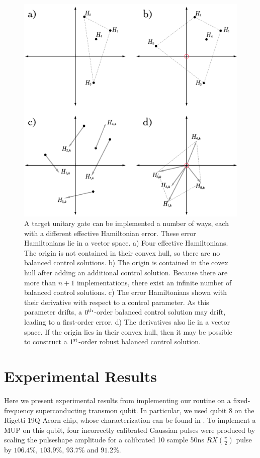 \documentclass[aps,nofootinbib,pra,notitlepage,twocolumn]{revtex4-1}
\begin{document}
\begin{figure}
  \centering
  \includegraphics[width=\columnwidth]{vectorspace.pdf}
  \caption{A target unitary gate can be implemented a number of ways, each with a different effective Hamiltonian error. These error Hamiltonians lie in a vector space. a) Four effective Hamiltonians. The origin is not contained in their convex hull, so there are no balanced control solutions. b) The origin is contained in the covex hull after adding an additional control solution. Because there are more than $n+1$ implementations, there exist an infinite number of balanced control solutions. c) The error Hamiltonians shown with their derivative with respect to a control parameter. As this parameter drifts, a $0^{\rm th}$-order balanced control solution may drift, leading to a first-order error. d) The derivatives also lie in a vector space. If the origin lies in their convex hull, then it may be possible to construct a $1^{\rm{st}}$-order robust balanced control solution.}
  \label{fig:vectorspace}
\end{figure}




\section{Experimental Results}
\label{sec:experimental_results}
Here we present experimental results from implementing our routine on a fixed-frequency superconducting transmon qubit. In particular, we used qubit 8 on the Rigetti 19Q-Acorn chip, whose characterization can be found in \cite{1712.05771}. To implement a MUP on this qubit, four incorrectly calibrated Gaussian pulses were produced by scaling the pulseshape amplitude for a calibrated 10 sample 50ns $RX(\frac{\pi}{2})$ pulse by $106.4\%$,  $103.9\%$, $93.7\%$ and $91.2\%$.
\end{document}
